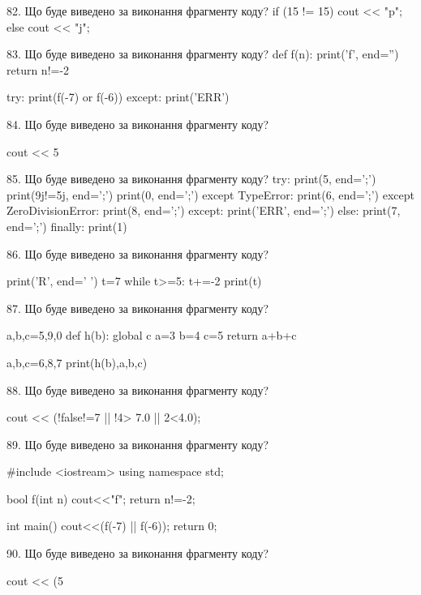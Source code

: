 \documentclass[11pt]{article}
\begin{document}

82. Що буде виведено за виконання фрагменту коду?
if (15 != 15)
    cout << "p";
else
    cout << "j";



83. Що буде виведено за виконання фрагменту коду?
def f(n):
    print('f', end='')
    return n!=-2

try:
    print(f(-7) or f(-6))
except:
    print('ERR')


84. Що буде виведено за виконання фрагменту коду?

cout << 5 %


85. Що буде виведено за виконання фрагменту коду?
try:
    print(5, end=';')
    print(9j!=5j, end=';')
    print(0, end=';')
except TypeError:
    print(6, end=';')
except ZeroDivisionError:
    print(8, end=';')
except:
    print('ERR', end=';')
else:
    print(7, end=';')
finally:
    print(1)


86. Що буде виведено за виконання фрагменту коду?

print('R', end=' ')
t=7
while t>=5:
    t+=-2
print(t)



87. Що буде виведено за виконання фрагменту коду?

a,b,c=5,9,0
def h(b):
global c    a=3
    b=4
    c=5
    return a+b+c

a,b,c=6,8,7
print(h(b),a,b,c)


88. Що буде виведено за виконання фрагменту коду?

cout << (!false!=7 || !4> 7.0 || 2<4.0);


89. Що буде виведено за виконання фрагменту коду?

#include <iostream>
using namespace std;

bool f(int n){
    cout<<"f";
    return n!=-2;
}

int main(){
    cout<<(f(-7) || f(-6));
    return 0;
}


90. Що буде виведено за виконання фрагменту коду?

cout << (5 %
\end{document}
